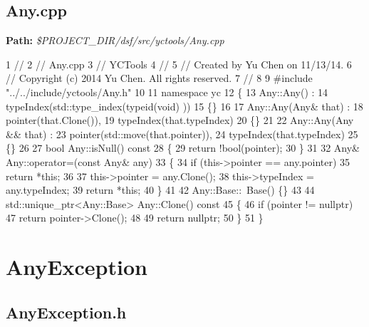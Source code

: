  \hypertarget{yctools_yctoolsAny_cpp}{}\subsection{Any.\+cpp}\label{yctools_yctoolsAny_cpp}
{\bfseries Path\+:} {\itshape \$\+P\+R\+O\+J\+E\+C\+T\+\_\+\+D\+I\+R/dsf/src/yctools/\+Any.cpp} 
\begin{DoxyCodeInclude}
1 \textcolor{comment}{//}
2 \textcolor{comment}{//  Any.cpp}
3 \textcolor{comment}{//  YCTools}
4 \textcolor{comment}{//}
5 \textcolor{comment}{//  Created by Yu Chen on 11/13/14.}
6 \textcolor{comment}{//  Copyright (c) 2014 Yu Chen. All rights reserved.}
7 \textcolor{comment}{//}
8 
9 \textcolor{preprocessor}{#include "../../include/yctools/Any.h"}
10 
11 \textcolor{keyword}{namespace }yc
12 \{
13     Any::Any() :
14     typeIndex(std::type\_index(typeid(void) ))
15     \{\}
16     
17     Any::Any(Any& that) :
18     pointer(that.Clone()),
19     typeIndex(that.typeIndex)
20     \{\}
21     
22     Any::Any(Any && that) :
23     pointer(std::move(that.pointer)),
24     typeIndex(that.typeIndex)
25     \{\}
26     
27     \textcolor{keywordtype}{bool} Any::isNull()\textcolor{keyword}{ const}
28 \textcolor{keyword}{    }\{
29         \textcolor{keywordflow}{return} !bool(pointer);
30     \}
31     
32     Any& Any::operator=(\textcolor{keyword}{const} Any& any)
33     \{
34         \textcolor{keywordflow}{if} (this->pointer == any.pointer)
35             \textcolor{keywordflow}{return} *\textcolor{keyword}{this};
36         
37         this->pointer = any.Clone();
38         this->typeIndex = any.typeIndex;
39         \textcolor{keywordflow}{return} *\textcolor{keyword}{this};
40     \}
41     
42     Any::Base::~Base() \{\}
43     
44     std::unique\_ptr<Any::Base> Any::Clone()\textcolor{keyword}{ const}
45 \textcolor{keyword}{    }\{
46         \textcolor{keywordflow}{if} (pointer != \textcolor{keyword}{nullptr})
47             \textcolor{keywordflow}{return} pointer->Clone();
48         
49         \textcolor{keywordflow}{return} \textcolor{keyword}{nullptr};
50     \}
51 \}
\end{DoxyCodeInclude}
 \hypertarget{yctools_yctoolsAnyException}{}\section{Any\+Exception}\label{yctools_yctoolsAnyException}
\hypertarget{yctools_yctoolsAnyException_h}{}\subsection{Any\+Exception.\+h}\label{yctools_yctoolsAnyException_h}

